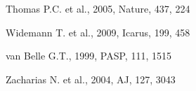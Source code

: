 \documentclass[useAMS,usenatbib]{mn2e}
\begin{document}
\begin{thebibliography}{99}
 Thomas P.C. et al., 2005,
Nature, 437, 224

 Widemann T. et al., 2009,
Icarus, 199, 458

 van Belle G.T., 1999,
PASP, 111, 1515

 Zacharias N. et al., 2004,
AJ, 127, 3043


















\end{thebibliography}
\end{document}

